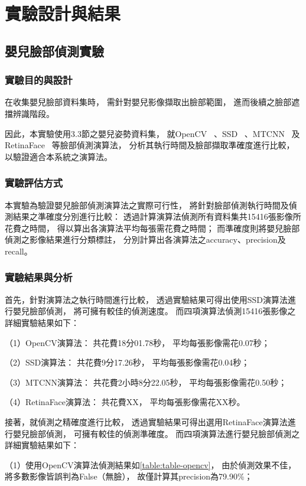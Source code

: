 \documentclass[class=NCU_thesis, crop=false]{standalone}
\begin{document}
\chapter{實驗設計與結果}

\section{嬰兒臉部偵測實驗}
\subsection{實驗目的與設計}
在收集嬰兒臉部資料集時，
需針對嬰兒影像擷取出臉部範圍，
進而後續之臉部遮擋辨識階段。

因此，本實驗使用3.3節之嬰兒姿勢資料集，
就OpenCV~\cite{goyal_face_2017}
、SSD~\cite{ye_face_2021}
、MTCNN~\cite{xiang_joint_2017}
及RetinaFace~\cite{deng_retinaface_2020}
等臉部偵測演算法，
分析其執行時間及臉部擷取準確度進行比較，
以驗證適合本系統之演算法。

\subsection{實驗評估方式}
本實驗為驗證嬰兒臉部偵測演算法之實際可行性，
將針對臉部偵測執行時間及偵測結果之準確度分別進行比較：
透過計算演算法偵測所有資料集共15416張影像所花費之時間，
得以算出各演算法平均每張需花費之時間；
而準確度則將嬰兒臉部偵測之影像結果進行分類標註，
分別計算出各演算法之accuracy、precision及recall。

\subsection{實驗結果與分析}
首先，針對演算法之執行時間進行比較，
透過實驗結果可得出使用SSD演算法進行嬰兒臉部偵測，
將可擁有較佳的偵測速度。
而四項演算法偵測15416張影像之詳細實驗結果如下：

（1）OpenCV演算法：
共花費18分01.78秒，
平均每張影像需花0.07秒；

（2）SSD演算法：
共花費9分17.26秒，
平均每張影像需花0.04秒；

（3）MTCNN演算法：
共花費2小時8分22.05秒，
平均每張影像需花0.50秒；

（4）RetinaFace演算法：
共花費XX，
平均每張影像需花XX秒。

接著，就偵測之精確度進行比較，
透過實驗結果可得出選用RetinaFace演算法進行嬰兒臉部偵測，
可擁有較佳的偵測準確度。
而四項演算法進行嬰兒臉部偵測之詳細實驗結果如下：

（1）使用OpenCV演算法偵測結果如\cref{table:table-opencv}，
由於偵測效果不佳，
將多數影像皆誤判為False（無臉），
故僅計算其precision為79.90\%；
\end{document}

